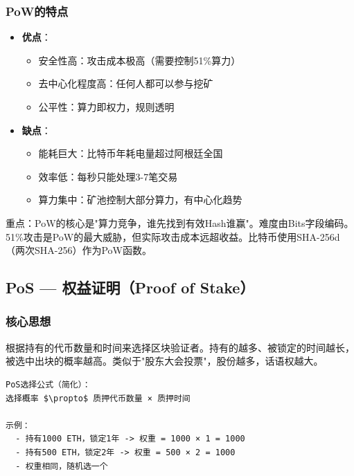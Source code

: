 ﻿\documentclass[12pt,a4paper]{article}
\begin{document}
\subsubsection{PoW的特点}

\begin{itemize}[leftmargin=1.5em]
\item \textbf{优点}：
  \begin{itemize}
  \item 安全性高：攻击成本极高（需要控制51\%算力）
  \item 去中心化程度高：任何人都可以参与挖矿
  \item 公平性：算力即权力，规则透明
  \end{itemize}
\item \textbf{缺点}：
  \begin{itemize}
  \item 能耗巨大：比特币年耗电量超过阿根廷全国
  \item 效率低：每秒只能处理3-7笔交易
  \item 算力集中：矿池控制大部分算力，有中心化趋势
  \end{itemize}
\end{itemize}

\begin{keypointbox}
重点：PoW的核心是"算力竞争，谁先找到有效Hash谁赢"。难度由Bits字段编码。51\%攻击是PoW的最大威胁，但实际攻击成本远超收益。比特币使用SHA-256d（两次SHA-256）作为PoW函数。
\end{keypointbox}

\subsection{PoS — 权益证明（Proof of Stake）}

\subsubsection{核心思想}

根据持有的代币数量和时间来选择区块验证者。持有的越多、被锁定的时间越长，被选中出块的概率越高。类似于"股东大会投票"，股份越多，话语权越大。

\begin{lstlisting}
PoS选择公式（简化）：
选择概率 $\propto$ 质押代币数量 × 质押时间

示例：
  - 持有1000 ETH，锁定1年 -> 权重 = 1000 × 1 = 1000
  - 持有500 ETH，锁定2年 -> 权重 = 500 × 2 = 1000
  - 权重相同，随机选一个
\end{lstlisting}
\end{document}
